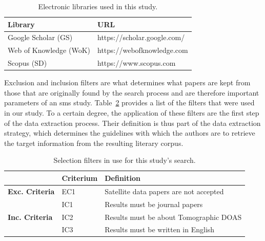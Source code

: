 \begin{table}[htb]
\centering
\caption{Electronic libraries used in this study.}
\label{tab:libraries}
    \begin{tabularx}{\textwidth}{ll}
        \toprule
        \textbf{Library}          & \textbf{URL}\\
        \midrule
        Google Scholar (GS)   & https://scholar.google.com/\\
        Web of Knowledge (WoK)& https://webofknowledge.com\\
        Scopus (SD)   & https://www.scopus.com\\
        \bottomrule
    \end{tabularx}
\end{table}

Exclusion and inclusion filters are what determines what papers are kept
from those that are originally found by the search process and are
therefore important parameters of an \gls{sms} study.
Table~\ref{tab:select_filters} provides a list of the filters that were
used in our study. To a certain degree, the application of these filters
are the first step of the data extraction process. Their definition is
thus part of the data extraction strategy, which determines the
guidelines with which the authors are to retrieve the target information
from the resulting literary corpus.

\begin{table}[htb]
\centering
\caption{Selection filters in use for this study's search.}
\label{tab:select_filters}
\begin{tabularx}{\textwidth}{lXl}%
\toprule
\multicolumn{1}{l}{} & \textbf{Criterium} & \textbf{Definition} \\ \midrule
\multirow{1}{*}{\textbf{Exc. Criteria}} & EC1 & Satellite data papers
are not accepted \\
\midrule
\multicolumn{1}{l}{\multirow{3}{*}{\textbf{Inc. Criteria}}} & IC1 &
Results must be journal papers \\
\multicolumn{1}{l}{} & IC2 & Results must be about Tomographic DOAS \\ 
\multicolumn{1}{l}{} & IC3 & Results must be written in English \\
\bottomrule
\end{tabularx}
\end{table}

